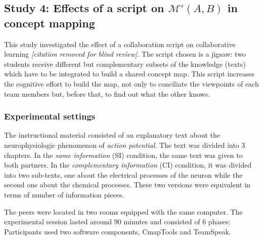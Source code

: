 \documentclass[natbib]{svjour3}
\newcommand{\gModel}[2]{{$\mathcal{M}^{\circ}(#1, #2)$}}
\begin{document}
\subsection{{\bf Study 4}:  Effects of a script on \gModel{A}{B}  in concept mapping}

This study investigated the effect of a collaboration script on collaborative
learning \textit{[citation removed for blind review]}. The script chosen is a
{\sc jigsaw}: two students receive different but complementary subsets of the
knowledge (texts) which have to be integrated to build a shared concept map.
This script increases the cognitive effort to build the map, not only to
conciliate the viewpoints of each team members but, before that, to find out
what the other knows. 

\subsubsection*{Experimental settings}

The instructional material consisted of an explanatory text about the
neurophysiologic phenomenon of \emph{action potential}. The text was divided
into 3 chapters.  In the \emph{same information} (SI) condition, the same text
was given to both partners. In the \emph{complementary information} (CI)
condition, it was divided into two sub-texts, one about the electrical processes
of the neuron while the second one about the chemical processes. These two
versions were equivalent in terms of number of information pieces. 

The peers were located in two rooms equipped with the same
computer.  The experimental session lasted around 90 minutes and consisted of 6
phases: Participants used two software components, {\sc CmapTools} and {\sc
TeamSpeak}.
\end{document}
